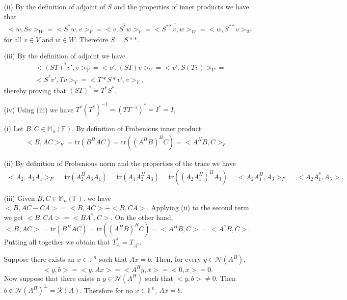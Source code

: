 \documentclass[letterpaper,12pt]{article}
\theoremstyle{definition}
\newenvironment{problem}[2][Problem]{\begin{trivlist}
\item[\hskip \labelsep {\bfseries #1}\hskip \labelsep {\bfseries #2.}]}{\end{trivlist}}
\begin{document}
\begin{problem}{39}
(ii)
By the definition of adjoint of $S$ and the properties of inner products we have that
\begin{align*}
    <w,Sv>_W=<S^*w,v>_V=
    \overline{<v,S^*w>_V}=\overline{<S^{**}v,w>_W}=
    <w,S^{**}v>_W
\end{align*}
for all $v\in V$ and $w\in W$.
Therefore $S=S**$.

(iii)
By the definition of adjoint we have
\begin{align*}
    &<(ST)^*v',v>_V=<v',(ST)v>_V=<v',S(Tv)>_V=\\
    &<S^*v',Tv>_V=<T*S*v',v>_V,
\end{align*}
thereby proving that $(ST)^*=T^*S^*$.

(iv)
Using (iii) we have $T^*(T^*)^{-1}=(TT^{-1})^*=I^*=I$.

\end{problem} \begin{problem}{40}
(i)
Let $B,C\in\mathbb M_n(\mathbb F)$.
By definition of Frobenious inner product
\begin{align*}
    <B,AC>_F=\text{tr}(B^HAC)=\text{tr}((A^HB)^HC)=<A^HB,C>_F.
\end{align*}

(ii)
By definition of Frobenious norm and the properties of the trace we have
\begin{align*}
    <A_2,A_3A_1>_F=\text{tr}(A_2^HA_3A_1)=
    \text{tr}(A_1A_2^HA_3)=\text{tr}((A_2A_1^H)^HA_3)=
    <A_2A_1^H,A_3>_F=<A_2A_1^*,A_3>.
\end{align*}

(iii)
Given $B,C\in\mathbb M_n(\mathbb F)$, we have $<B,AC-CA>=<B,AC>-<B,CA>$.
Applying (ii) to the second term we get $<B,CA>=<BA^*,C>$.
On the other hand,
\begin{equation*}
    <B,AC>=\text{tr}(B^HAC)=\text{tr}((A^HB)^HC)=<A^HB,C>=<A^*B,C>.
\end{equation*}
Putting all together we obtain that $T_A^*=T_{A^*}$.

\end{problem} \begin{problem}{44}
Suppose there exists an $x\in\mathbb F^n$ such that $Ax=b$.
Then, for every $y\in\mathcal N(A^H)$,
$$<y,b>=<y,Ax>=<A^Hy,x>=<0,x>=0.$$
Now suppose that there exists a $y\in\mathcal N(A^H)$ such that $<y,b>\neq0$.
Then $b\notin\mathcal N(A^H)^\perp=\mathcal R(A)$.
Therefore for no $x\in\mathbb F^n$, $Ax=b$.


\end{problem}
\end{document}
